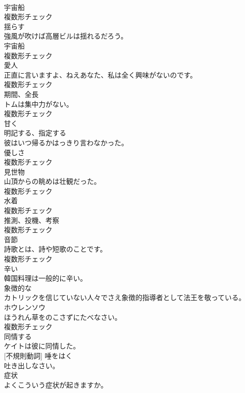 \documentclass[8pt]{extreport}
\begin{document}
\begin{CJK}{UTF8}{min}
\\	[名詞]	宇宙船	
\\	複数形チェック
\\	[動詞]	揺らす	
\\	強風が吹けば高層ビルは揺れるだろう。	
\\	[名詞]	宇宙船	
\\	複数形チェック
\\	[名詞]	愛人	
\\	正直に言いますよ、ねえあなた、私は全く興味がないのです。	
\\	複数形チェック
\\	[名詞]	期間、全⻑	
\\	トムは集中力がない。	
\\	複数形チェック
\\	[副詞]	甘く	
\\	[動詞]	明記する、指定する	
\\	彼はいつ帰るかはっきり言わなかった。	
\\	[名詞]	優しさ	
\\	複数形チェック
\\	[名詞]	見世物	
\\	山頂からの眺めは壮観だった。	
\\	複数形チェック
\\	[名詞]	水着	
\\	複数形チェック
\\	[名詞]	推測、投機、考察	
\\	複数形チェック
\\	[名詞]	音節	
\\	詩歌とは、詩や短歌のことです。	
\\	複数形チェック
\\	[形容詞]	辛い	
\\	韓国料理は一般的に辛い。	
\\	[形容詞]	象徴的な	
\\	カトリックを信じていない人々でさえ象徴的指導者として法王を敬っている。	
\\	[名詞]	ホウレンソウ	
\\	ほうれん草をのこさずにたべなさい。	
\\	複数形チェック
\\	[動詞]	同情する	
\\	ケイトは彼に同情した。	
\\	[動詞] [不規則動詞]	唾をはく	
\\	吐き出しなさい。	
\\	[名詞]	症状	
\\	よくこういう症状が起きますか。	

\end{CJK}
\end{document}
